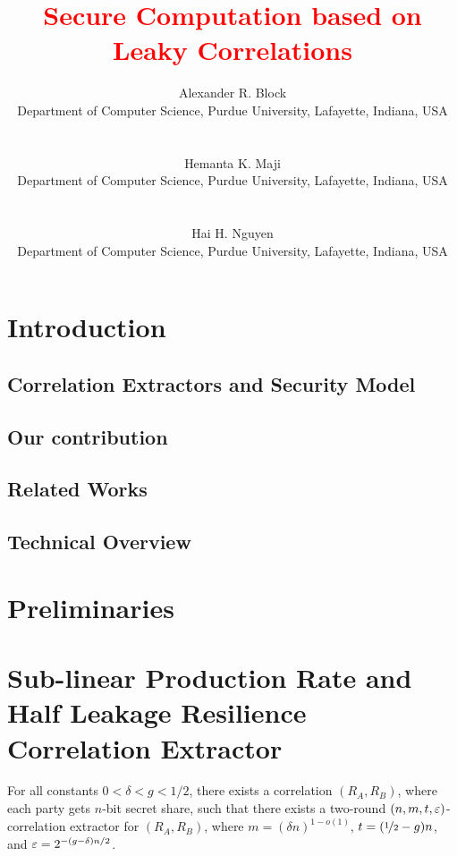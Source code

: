 \documentclass{article}
\author{
	{\normalsize Alexander R. Block}\\
	{\footnotesize Department of Computer Science, Purdue University, Lafayette, Indiana, USA} \\ {\alexemail}\\ \\%
	{\normalsize Hemanta K. Maji}\\{\footnotesize Department of Computer Science, Purdue University, Lafayette, Indiana, USA} \\ {\majiemail}\\ \\%
	{\normalsize Hai H. Nguyen}\\ {\footnotesize Department of Computer Science, Purdue University, Lafayette, Indiana, USA} \\ {\haiemail}%
}
\title{\textcolor{red}{\bfseries Secure Computation based on Leaky Correlations}}
\date{}
\begin{document}
\maketitle




\section{Introduction}

	\subsection{Correlation Extractors and Security Model}
	\subsection{Our contribution}
		
	\subsection{Related Works}
	\subsection{Technical Overview}

\section{Preliminaries}

\section{Sub-linear Production Rate and Half Leakage Resilience Correlation Extractor}
	\begin{theorem}
	\label{thm:construction}
	For all constants $0<\delta<g<1/2$, there exists a correlation $(R_A,R_B)$, where each party gets $n$-bit secret share, such that there exists a two-round $(n,m,t,\varepsilon)$-correlation extractor for $(R_A,R_B)$, where $m=(\delta n)^{1-o(1)}$, $t=(\nicefrac12-g)n$, and $\varepsilon=2^{-(g-\delta)n/2}$. 
	\end{theorem}
\end{document}
